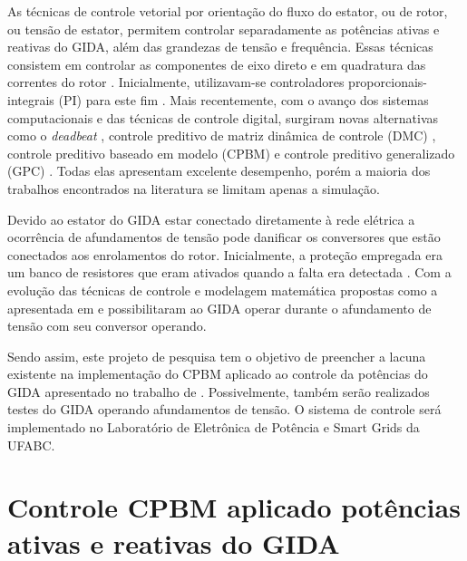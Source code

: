 	As técnicas de controle vetorial por orientação do fluxo do estator, ou de rotor, ou tensão de estator, permitem controlar separadamente as potências ativas e reativas do GIDA, além das grandezas de tensão e frequência. Essas técnicas consistem em controlar as componentes de eixo direto e em quadratura das correntes do rotor \cite{murilodq}. Inicialmente, utilizavam-se controladores proporcionais-integrais (PI) para este fim \cite{alfeu}. Mais recentemente, com o avanço dos sistemas computacionais e das técnicas de controle digital, surgiram novas alternativas como o \emph{deadbeat} \cite{deadbeat,deadbeatieee}, controle preditivo de matriz dinâmica de controle (DMC) \cite{dmcieee}, controle preditivo baseado em modelo (CPBM) \cite{alfeu,paperalfeu} e controle preditivo generalizado (GPC) \cite{gpcieee}. Todas elas apresentam excelente desempenho, porém a maioria dos trabalhos encontrados na literatura se limitam apenas a simulação.
	
	Devido ao estator do GIDA estar conectado diretamente à rede elétrica a ocorrência de afundamentos de tensão pode danificar os conversores que estão conectados aos enrolamentos do rotor. Inicialmente, a proteção empregada era um banco de resistores que eram ativados quando a falta era detectada \cite{rodrigo8afundamento,rodrigo9afundamento}. Com a evolução das técnicas de controle e modelagem matemática propostas como a apresentada em   e  possibilitaram ao GIDA operar durante o afundamento de tensão com seu conversor operando.
	
	Sendo assim, este projeto de pesquisa tem o objetivo de preencher a lacuna existente na implementação do CPBM aplicado ao controle da potências do GIDA apresentado no trabalho de . Possivelmente, também serão realizados testes do GIDA operando afundamentos de tensão. O sistema de controle será implementado no Laboratório de Eletrônica de Potência e Smart Grids da UFABC.
	
	\begingroup
		\let\clearpage\relax
		\chapter{Controle CPBM aplicado potências ativas e reativas do GIDA}
		\label{capitulo:teoria}
	\endgroup
	
